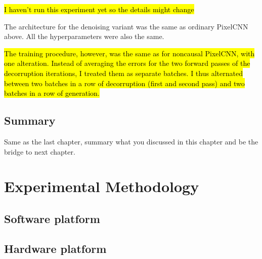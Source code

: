 \documentclass[11pt, a4paper]{book}
\begin{document}
\hl{I haven't run this experiment yet so the details might change}

The architecture for the denoising variant was the same as ordinary PixelCNN above. All the hyperparameters were also the same.

\hl{The training procedure, however, was the same as for noncausal PixelCNN, with one alteration. Instead of averaging the errors for the two forward passes of the decorruption iterations, I treated them as separate batches. I thus alternated between two batches in a row of decorruption (first and second pass) and two batches in a row of generation.}

\section{Summary}
Same as the last chapter, summary what you discussed in this chapter and
be the bridge to next chapter.


\chapter{Experimental Methodology}
\label{cha:methodology}

\section{Software platform}
\label{sec:softplat}



\section{Hardware platform}
\label{sec:hardplat}
\end{document}
